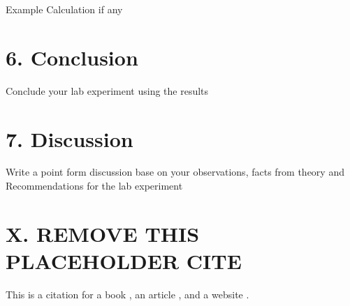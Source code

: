 \documentclass[a4paper,12pt]{article}
\begin{document}
Example Calculation if any


\section*{6. Conclusion}

Conclude your lab experiment using the results


\section*{7. Discussion}

Write a point form discussion base on your observations, facts from theory and Recommendations for the lab experiment


\section*{X. REMOVE THIS PLACEHOLDER CITE}
This is a citation for a book \parencite{Doe2020}, an article \parencite{Smith2021}, and a website \parencite{Website2022}.

\newpage
\printbibliography[title={References}]
\end{document}
